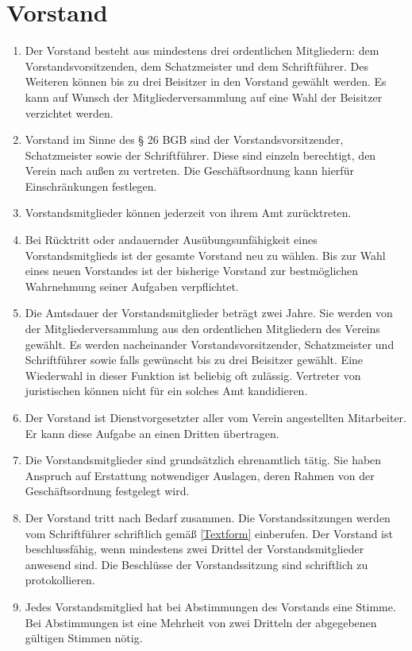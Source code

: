 \documentclass[fontsize=12pt,paper=a4,pagesize,headings=small]{scrartcl}
\begin{document}
\section{Vorstand}\label{vorstand}
\begin{enumerate}
    \item Der Vorstand besteht aus mindestens drei ordentlichen
    Mitgliedern: dem Vorstandsvorsitzenden, dem Schatzmeister und dem
    Schriftführer. Des Weiteren können bis zu drei Beisitzer in den
    Vorstand gewählt werden. Es kann auf Wunsch der
    Mitgliederversammlung auf eine Wahl der Beisitzer verzichtet
    werden.

    \item Vorstand im Sinne des § 26 BGB sind der Vorstandsvorsitzender,
    Schatzmeister sowie der Schriftführer. Diese sind einzeln
    berechtigt, den Verein nach außen zu vertreten. Die
    Geschäftsordnung kann hierfür Einschränkungen festlegen.

    \item Vorstandsmitglieder können jederzeit von ihrem Amt
    zurücktreten.

    \item Bei Rücktritt oder andauernder Ausübungsunfähigkeit eines
    Vorstandsmitglieds ist der gesamte Vorstand neu zu wählen. Bis zur
    Wahl eines neuen Vorstandes ist der bisherige Vorstand zur
    bestmöglichen Wahrnehmung seiner Aufgaben verpflichtet.

    \item Die Amtsdauer der Vorstandsmitglieder beträgt zwei Jahre. Sie
    werden von der Mitgliederversammlung aus den ordentlichen
    Mitgliedern des Vereins gewählt. Es werden nacheinander
    Vorstandsvorsitzender, Schatzmeister und Schriftführer sowie falls
    gewünscht bis zu drei Beisitzer gewählt. Eine Wiederwahl in dieser
    Funktion ist beliebig oft zulässig. Vertreter von juristischen
    können nicht für ein solches Amt kandidieren.

    \item Der Vorstand ist Dienstvorgesetzter aller vom Verein
    angestellten Mitarbeiter. Er kann diese Aufgabe an einen
    Dritten übertragen.

    \item Die Vorstandsmitglieder sind grundsätzlich ehrenamtlich
    tätig. Sie haben Anspruch auf Erstattung notwendiger Auslagen,
    deren Rahmen von der Geschäftsordnung festgelegt wird.

    \item Der Vorstand tritt nach Bedarf zusammen. Die
    Vorstandssitzungen werden vom Schriftführer schriftlich gemäß
    \ref{Textform} einberufen. Der Vorstand ist beschlussfähig,
    wenn mindestens zwei Drittel der Vorstandsmitglieder anwesend sind.
    Die Beschlüsse der Vorstandssitzung sind schriftlich zu
    protokollieren.

    \item Jedes Vorstandsmitglied hat bei Abstimmungen des Vorstands
    eine Stimme. Bei Abstimmungen ist eine Mehrheit von zwei Dritteln
    der abgegebenen gültigen Stimmen nötig.
\end{enumerate}
\end{document}
